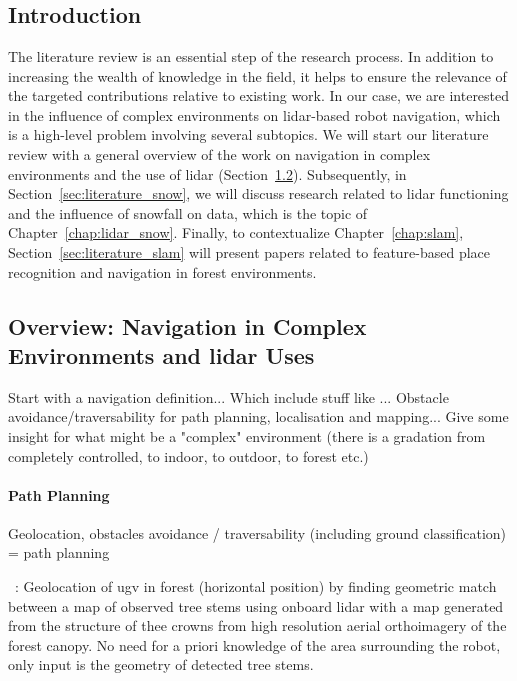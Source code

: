 \chapter{\chapzerotitle}
\label{chap:literature_review}


\section{Introduction}
The literature review is an essential step of the research process. In addition to increasing the wealth of knowledge in the field, it helps to ensure the relevance of the targeted contributions relative to existing work. In our case, we are interested in the influence of complex environments on \gls*{lidar}-based robot navigation, which is a high-level problem involving several subtopics. We will start our literature review with a general overview of the work on navigation in complex environments and the use of \gls*{lidar} (Section~\ref{sec:literature_general}). Subsequently, in Section~\ref{sec:literature_snow}, we will discuss research related to \gls*{lidar} functioning and the influence of snowfall on data, which is the topic of Chapter~\ref{chap:lidar_snow}. Finally, to contextualize Chapter~\ref{chap:slam}, Section~\ref{sec:literature_slam} will present papers related to feature-based place recognition and navigation in forest environments. 


\section{Overview: Navigation in Complex Environments and \gls*{lidar} Uses}
\label{sec:literature_general}

Start with a navigation definition... Which include stuff like ... Obstacle avoidance/traversability for path planning, localisation and mapping... 
Give some insight for what might be a "complex" environment (there is a gradation from completely controlled, to indoor, to outdoor, to forest etc.)

\subsubsection{Path Planning}
Geolocation, obstacles avoidance / traversability (including ground classification) = path planning

~\cite{Hussein2015}:
Geolocation of ugv in forest (horizontal position) by finding geometric match between a map of observed tree stems using onboard lidar with a map generated from the structure of thee crowns from high resolution aerial orthoimagery of the forest canopy. No need for a priori knowledge of the area surrounding the robot, only input is the geometry of detected tree stems.


